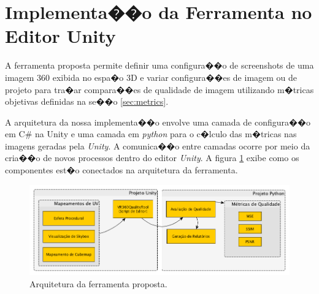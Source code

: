 \documentclass[12pt]{article}
\begin{document}




\section{Implementa��o da Ferramenta no Editor Unity}  \label{sec:unitytool}

A ferramenta proposta permite definir uma configura��o de screenshots de uma imagem 360 exibida no espa�o 3D e variar configura��es de imagem ou de projeto para tra�ar compara��es de qualidade de imagem utilizando m�tricas objetivas definidas na se��o \ref{sec:metrics}.

A arquitetura da nossa implementa��o envolve uma camada de configura��o em C\# na Unity e uma camada em \textit{python} para o c�lculo das m�tricas nas imagens geradas pela \textit{Unity}. A comunica��o entre camadas ocorre por meio da cria��o de novos processos dentro do editor \textit{Unity}. A figura \ref{fig:toolarch} exibe como os componentes est�o conectados na arquitetura da ferramenta.

\begin{figure}[ht]
\centering
\includegraphics[width=\textwidth]{../images/tool_arch.png}
\caption{Arquitetura da ferramenta proposta.}
\label{fig:toolarch}
\end{figure}
\end{document}

